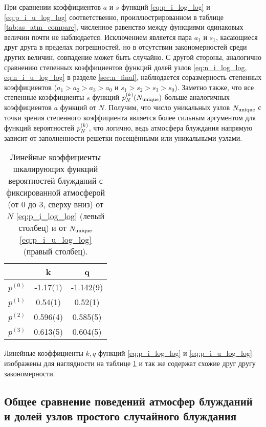 При сравнении коэффициентов $a$ и $s$ функций \eqref{eq:p_i_log_log} и \eqref{eq:p_i_u_log_log} соответственно, проиллюстрированном в таблице \ref{tab:as_atm_compare}, численное равенство между функциями одинаковых величин почти не наблюдается.
Исключением является пара $a_1$ и $s_1$, касающиеся друг друга в пределах погрешностей, но в отсутствии закономерностей среди других величин, совпадение может быть случайно.
С другой стороны, аналогично сравнению степенных коэффициентов функций долей узлов \eqref{eq:n_i_log_log, eq:n_i_u_log_log} в разделе \ref{sec:n_final}, наблюдается соразмерность степенных коэффициентов ($a_1 > a_2 > a_3 > a_0$ и $s_1 > s_2 > s_3 > s_0$). 
Заметно также, что все степенные коэффициенты $s$ функций $p^{(k)}_N(N_{\textup{unique}})$ больше аналогичных коэффициентов $a$ функций от $N$.
Получим, что число уникальных узлов $N_{\textup{unique}}$ с точки зрения степенного коэффициента является более сильным аргументом для функций вероятностей $p^{(k)}_N$, что логично, ведь атмосфера блуждания напрямую зависит от заполненности решетки посещёнными или уникальными узлами.

\begin{table}[h]
\centering
\begin{tabular}{|c|c|c|}
\hline
 & k & q \\ \hline
$p^{(0)}$ & -1.17(1) &  -1.142(9) \\ \hline
$p^{(1)}$ & 0.54(1) & 0.52(1) \\ \hline
$p^{(2)}$ & 0.596(4) & 0.585(5) \\ \hline
$p^{(3)}$ & 0.613(5) & 0.604(5) \\ \hline
\end{tabular}
\caption{Линейные коэффициенты шкалирующих функций вероятностей блужданий с фиксированной атмосферой (от 0 до 3, сверху вниз) от $N$ \eqref{eq:p_i_log_log} (левый столбец) и от $N_{\textup{unique}}$ \eqref{eq:p_i_u_log_log} (правый столбец).}
\label{tab:kq_atm_compare}
\end{table}

Линейные коэффициенты $k, q$  функций \eqref{eq:p_i_log_log} и \eqref{eq:p_i_u_log_log} изображены для наглядности на таблице \ref{tab:kq_atm_compare} и так же содержат схожие друг другу закономерности.


\newpage

\subsection{Общее сравнение поведений атмосфер блужданий и долей узлов простого случайного блуждания}


